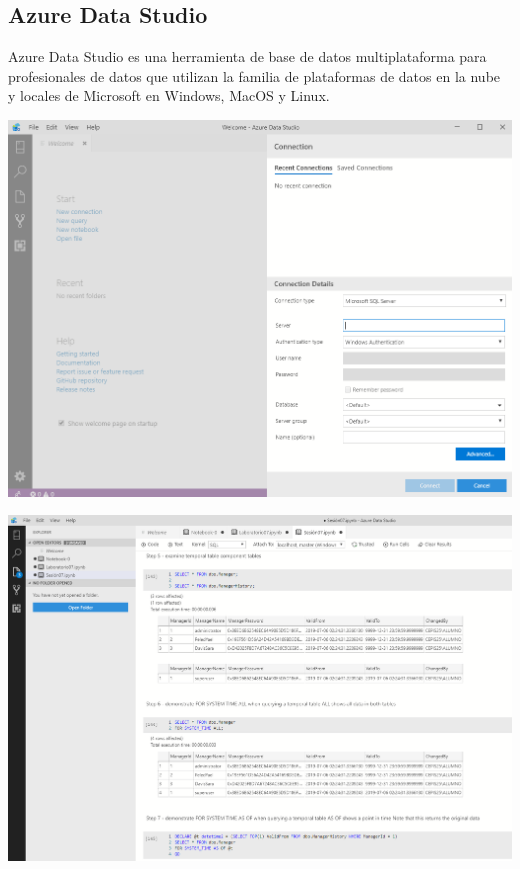 

\subsection{Azure Data Studio }
Azure Data Studio es una herramienta de base de datos multiplataforma para profesionales de datos que utilizan la familia de plataformas de datos en la nube y locales de Microsoft en Windows, MacOS y Linux.

\begin{center}
		\includegraphics[width=15cm]{./Imagenes/0}
		\end{center}

\begin{center}
		\includegraphics[width=15cm]{./Imagenes/1}
		\end{center}


